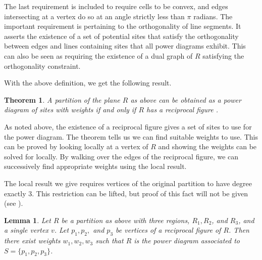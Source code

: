 \documentclass[a4paper, 11pt]{article}
\newtheorem{theorem}{Theorem}[section]
\newtheorem{lemma}{Lemma}[section]
\begin{document}
The last requirement is included to require cells to be convex, and edges intersecting at a vertex do so at an angle strictly less than $\pi$ radians.
The important requirement is pertaining to the orthogonality of line segments. It asserts the existence of a set of potential sites that satisfy the
orthogonality between edges and lines containing sites that all power diagrams exhibit. This can also be seen as requiring the existence of a dual
graph of $R$ satisfying the orthogonality constraint.

With the above definition, we get the following result.

\begin{theorem}
  A partition of the plane $R$ as above can be obtained as a power diagram of sites with weights if and only if $R$ has a reciprocal figure
  \cite{ash-bolker}.
  \label{thm:pow_rec}
\end{theorem}

As noted above, the existence of a reciprocal figure gives a set of sites to use for the power diagram. The theorem tells us we can find suitable
weights to use. This can be proved by looking locally at a vertex of $R$ and showing the weights can be solved for locally. By walking over the edges
of the reciprocal figure, we can successively find appropriate weights using the local result.

The local result we give requires vertices of the original partition to have degree exactly 3. This restriction can be lifted, but proof of this fact
will not be given (see \cite{ash-bolker}).

\begin{lemma}
  Let $R$ be a partition as above with three regions, $R_1, R_2$, and $R_3$, and a single vertex $v$. Let $p_1, p_2,$ and $p_3$ be vertices of a reciprocal figure of $R$. Then there exist weights
  $w_1, w_2, w_3$ such that $R$ is the power diagram associated to $S = \{ p_1, p_2, p_3 \}$.
  \label{lem:rec_loc}
\end{lemma}
\end{document}
